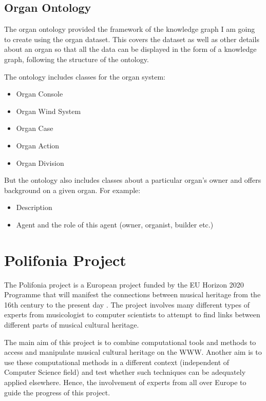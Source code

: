 \subsection{Organ Ontology}
\hspace{0.5cm} The organ ontology provided the framework of the knowledge graph I am going to create using the organ dataset. This covers the dataset as well as other details about an organ so that all the data can be displayed in the form of a knowledge graph, following the structure of the ontology. 

The ontology includes classes for the organ system:
\begin{itemize}
\item Organ Console
\item Organ Wind System
\item Organ Case
\item Organ Action
\item Organ Division
\end{itemize}

But the ontology also includes classes about a particular organ's owner and offers background on a given organ. For example:
\begin{itemize}
\item Description
\item Agent and the role of this agent (owner, organist, builder etc.)
\end{itemize}

\section{Polifonia Project}
\hspace{0.5cm} The Polifonia project is a European project funded by the EU Horizon 2020 Programme that will manifest the connections between musical heritage from the 16th century to the present day \cite{polifonia}. The project involves many different types of experts from musicologist to computer scientists to attempt to find links between different parts of musical cultural heritage. 

The main aim of this project is to combine computational tools and methods to access and manipulate musical cultural heritage on the WWW. Another aim is to use these computational methods in a different context (independent of Computer Science field) and test whether such techniques can be adequately applied elsewhere. Hence, the involvement of experts from all over Europe to guide the progress of this project. \cite{polifoniaproject}

